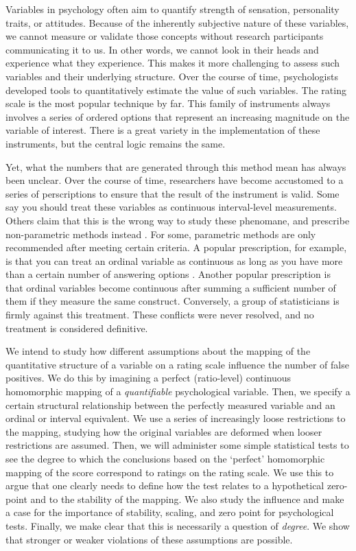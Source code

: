 \documentclass[utf8]{FrontiersinVancouver}
\begin{document}
Variables in psychology often aim to quantify strength of sensation, personality traits, or attitudes. Because of the inherently subjective nature of these variables, we cannot measure or validate those concepts without research participants communicating it to us. In other words, we cannot look in their heads and experience what they experience. This makes it more challenging to assess such variables and their underlying structure. Over the course of time, psychologists developed tools to quantitatively estimate the value of such variables. The rating scale is the most popular technique by far. This family of instruments always involves a series of ordered options that represent an increasing magnitude on the variable of interest. There is a great variety in the implementation of these instruments, but the central logic remains the same. 

Yet, what the numbers that are generated through this method mean has always been unclear. Over the course of time, researchers have become accustomed to a series of perscriptions to ensure that the result of the instrument is valid. Some say you should treat these variables as continuous interval-level measurements. Others claim that this is the wrong way to study these phenomane, and prescribe non-parametric methods instead \citep{knappTreatingOrdinalScales1990}. For some, parametric methods are only recommended after meeting certain criteria. A popular prescription, for example, is that you can treat an ordinal variable as continuous as long as you have more than a certain number of answering options \citep{wuCanLikertScales2017}. Another popular prescription is that ordinal variables become continuous after summing a sufficient number of them if they measure the same construct. Conversely, a group of statisticians is firmly against this treatment. These conflicts were never resolved, and no treatment is considered definitive.

We intend to study how different assumptions about the mapping of the quantitative structure of a variable on a rating scale influence the number of false positives. We do this by imagining a perfect (ratio-level) continuous homomorphic mapping of a \textit{quantifiable} psychological variable. Then, we specify a certain structural relationship between the perfectly measured variable and an ordinal or interval equivalent. We use a series of increasingly loose restrictions to the mapping, studying how the original variables are deformed when looser restrictions are assumed. Then, we will administer some simple statistical tests to see the degree to which the conclusions based on the `perfect' homomorphic mapping of the score correspond to ratings on the rating scale. We use this to argue that one clearly needs to define how the test relates to a hypothetical zero-point and to the stability of the mapping. We also study the influence and make a case for the importance of stability, scaling, and zero point for psychological tests. Finally, we make clear that this is necessarily a question of \textit{degree}. We show that stronger or weaker violations of these assumptions are possible.
\end{document}
